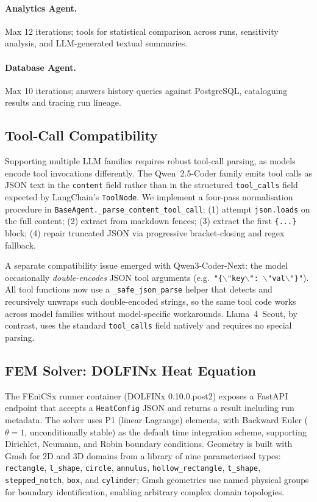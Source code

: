 \documentclass[twocolumn]{article}
\begin{document}
\paragraph{Analytics Agent.}
Max 12 iterations; tools for statistical comparison across runs,
sensitivity analysis, and LLM-generated textual summaries.

\paragraph{Database Agent.}
Max 10 iterations; answers history queries against PostgreSQL,
cataloguing results and tracing run lineage.

\subsection{Tool-Call Compatibility}
\label{sec:tool-compat}

Supporting multiple LLM families requires robust tool-call parsing, as
models encode tool invocations differently.  The Qwen~2.5-Coder family
emits tool calls as JSON text in the \texttt{content} field rather than in
the structured \texttt{tool\_calls} field expected by LangChain's
\texttt{ToolNode}.  We implement a four-pass normalisation procedure in
\texttt{BaseAgent.\_parse\_content\_tool\_call}:
(1) attempt \texttt{json.loads} on the full content;
(2) extract from markdown fences;
(3) extract the first \texttt{\{...\}} block;
(4) repair truncated JSON via progressive bracket-closing and regex fallback.

A separate compatibility issue emerged with Qwen3-Coder-Next: the model
occasionally \emph{double-encodes} JSON tool arguments (e.g.\
\texttt{"\{$\backslash$"key$\backslash$": $\backslash$"val$\backslash$"\}"}).
All tool functions now use a \texttt{\_safe\_json\_parse} helper that detects
and recursively unwraps such double-encoded strings, so the same tool code
works across model families without model-specific workarounds.
Llama~4~Scout, by contrast, uses the standard \texttt{tool\_calls} field
natively and requires no special parsing.

\subsection{FEM Solver: DOLFINx Heat Equation}

The FEniCSx runner container (DOLFINx 0.10.0.post2) exposes a FastAPI
endpoint that accepts a \texttt{HeatConfig} JSON and returns a result
including run metadata.  The solver uses P1 (linear Lagrange) elements,
with Backward Euler ($\theta = 1$, unconditionally stable) as the default
time integration scheme, supporting Dirichlet, Neumann, and Robin boundary
conditions.  Geometry is built with Gmsh \citep{geuzaine2009gmsh} for 2D
and 3D domains from a library of nine parameterised types: \texttt{rectangle},
\texttt{l\_shape}, \texttt{circle}, \texttt{annulus}, \texttt{hollow\_rectangle},
\texttt{t\_shape}, \texttt{stepped\_notch}, \texttt{box}, and \texttt{cylinder};
Gmsh geometries use named physical groups for boundary identification,
enabling arbitrary complex domain topologies.
\end{document}
